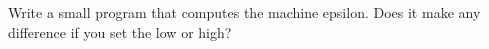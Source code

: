   Write a small program that computes the machine epsilon. Does it
  make any difference if you set the
   low or high?

